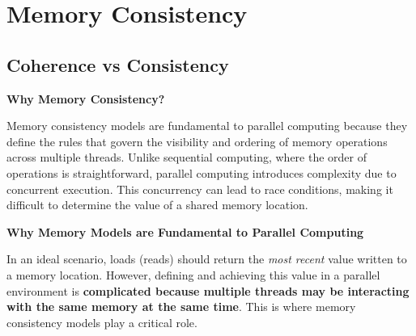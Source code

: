 \section{Memory Consistency}

\subsection{Coherence vs Consistency}

\begin{flushleft}
    \textcolor{Green3}{ \textbf{Why Memory Consistency?}}
\end{flushleft}
Memory consistency models are fundamental to parallel computing because they define the rules that govern the visibility and ordering of memory operations across multiple threads. Unlike sequential computing, where the order of operations is straightforward, parallel computing introduces complexity due to concurrent execution. This concurrency can lead to race conditions, making it difficult to determine the  value of a shared memory location.

\highspace
\begin{flushleft}
    \textcolor{Green3}{ \textbf{Why Memory Models are Fundamental to Parallel Computing}}
\end{flushleft}
In an ideal scenario, loads (reads) should return the \emph{most recent} value written to a memory location. However, defining and achieving this  value in a parallel environment is \textbf{complicated because multiple threads may be interacting with the same memory at the same time}. This is where memory consistency models play a critical role.

